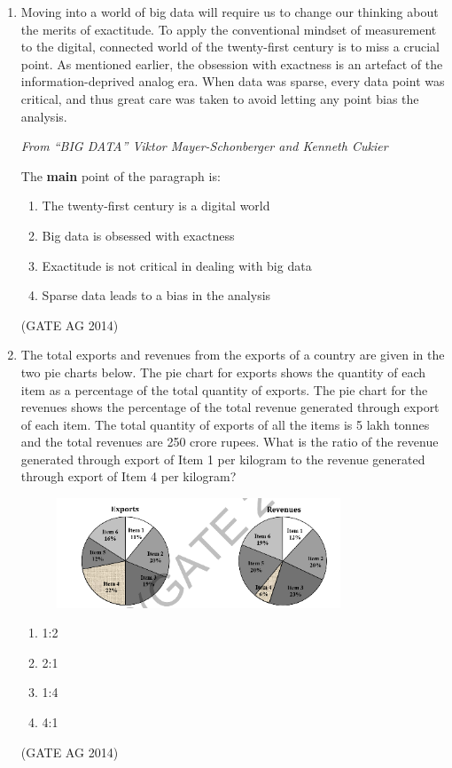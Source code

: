 \documentclass[journal,12pt,onecolumn]{IEEEtran}
\begin{document}
\begin{enumerate}
\item Moving into a world of big data will require us to change our thinking about the merits of exactitude. 
To apply the conventional mindset of measurement to the digital, connected world of the twenty-first century 
is to miss a crucial point. As mentioned earlier, the obsession with exactness is an artefact of the 
information-deprived analog era. When data was sparse, every data point was critical, and thus great care was 
taken to avoid letting any point bias the analysis.  

\textit{From ``BIG DATA'' Viktor Mayer-Schonberger and Kenneth Cukier}  

\medskip
The \textbf{main} point of the paragraph is:

    \begin{enumerate}
        \item The twenty-first century is a digital world
        \item Big data is obsessed with exactness
        \item Exactitude is not critical in dealing with big data
        \item Sparse data leads to a bias in the analysis
    \end{enumerate}
    \hfill(GATE AG 2014)

    \item The total exports and revenues from the exports of a country are given in the two pie charts below.
    The pie chart for exports shows the quantity of each item as a percentage of the total quantity of exports. The pie chart for the revenues shows the percentage of the total revenue generated through export of each item. The total quantity of exports of all the items is 5 lakh tonnes and the total revenues are 250 crore rupees. What is the ratio of the revenue generated through export of Item 1 per kilogram to the revenue generated through export of Item 4 per kilogram?
    \begin{figure}[H]
        \centering
        \includegraphics[width=0.8\textwidth]{Fig.png}
        \caption{}
        \label{fig:Q8}
    \end{figure}
    \begin{multicols}{4}
    \begin{enumerate}
        \item 1:2
        \item 2:1
        \item 1:4
        \item 4:1
    \end{enumerate}
    \end{multicols}
    \hfill(GATE AG 2014)


\end{enumerate}
\end{document}
